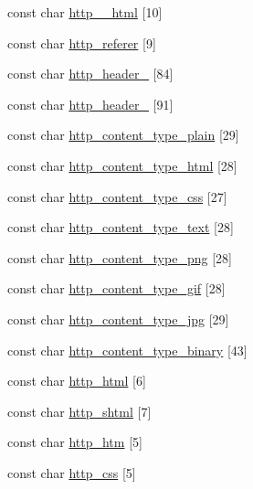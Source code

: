 \begin{DoxyCompactItemize}
const char \hyperlink{http-strings_8h_ae31e183cd9f67c1ec51663c38180b8ee}{http\_\_\-html} \mbox{[}10\mbox{]}
\item 
const char \hyperlink{http-strings_8h_a52402a0f5f1a643cf91cec0333241654}{http\_\-referer} \mbox{[}9\mbox{]}
\item 
const char \hyperlink{http-strings_8h_af0c31564afc8cb5ffe3006045593564a}{http\_\-header\_} \mbox{[}84\mbox{]}
\item 
const char \hyperlink{http-strings_8h_ae076ba5c11f61efb98c599b3252ea8e7}{http\_\-header\_} \mbox{[}91\mbox{]}
\item 
const char \hyperlink{http-strings_8h_a93ca46951cc4842f1abde782f3d2358d}{http\_\-content\_\-type\_\-plain} \mbox{[}29\mbox{]}
\item 
const char \hyperlink{http-strings_8h_a9067d0f43f75f731ec8b6cf5bc937b46}{http\_\-content\_\-type\_\-html} \mbox{[}28\mbox{]}
\item 
const char \hyperlink{http-strings_8h_a5475ca39ad42a7477a35e10e34697775}{http\_\-content\_\-type\_\-css} \mbox{[}27\mbox{]}
\item 
const char \hyperlink{http-strings_8h_aed57746b7fb18ac9361cfa7dc05c9782}{http\_\-content\_\-type\_\-text} \mbox{[}28\mbox{]}
\item 
const char \hyperlink{http-strings_8h_a371c581997fc6a5803c3551e33be77db}{http\_\-content\_\-type\_\-png} \mbox{[}28\mbox{]}
\item 
const char \hyperlink{http-strings_8h_aef053704ad19e807a1f0f19cb060f3c6}{http\_\-content\_\-type\_\-gif} \mbox{[}28\mbox{]}
\item 
const char \hyperlink{http-strings_8h_a34bd96a209a37f4b16744500510c50a0}{http\_\-content\_\-type\_\-jpg} \mbox{[}29\mbox{]}
\item 
const char \hyperlink{http-strings_8h_a2ce17b5a8d67c7d96121463bf239ea68}{http\_\-content\_\-type\_\-binary} \mbox{[}43\mbox{]}
\item 
const char \hyperlink{http-strings_8h_ac61a385f177ab70118739cc3e38c11af}{http\_\-html} \mbox{[}6\mbox{]}
\item 
const char \hyperlink{http-strings_8h_a52dc3e4726e77d123639f5a2ef5d82d8}{http\_\-shtml} \mbox{[}7\mbox{]}
\item 
const char \hyperlink{http-strings_8h_a26642210d36f0e7f65fb3a98402e8f88}{http\_\-htm} \mbox{[}5\mbox{]}
\item 
const char \hyperlink{http-strings_8h_ac0d021741ad67c52f199e8a22037ac8e}{http\_\-css} \mbox{[}5\mbox{]}
\item 

\end{DoxyCompactItemize}
